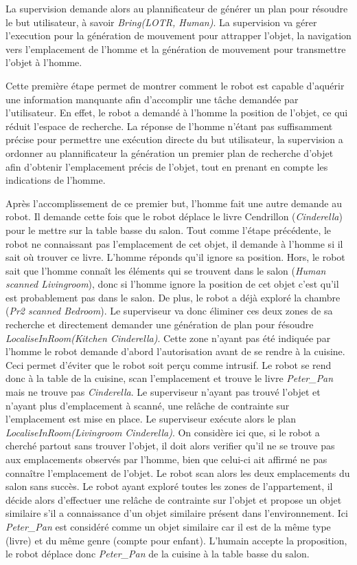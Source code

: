 \documentclass[a4paper,11pt,twoside]{StyleThese}
\begin{document}
La supervision demande alors au plannificateur de générer un plan pour résoudre le but utilisateur, à savoir \textit{Bring(LOTR, Human)}.
La supervision va gérer l'execution pour la génération de mouvement pour attrapper l'objet, la navigation vers l'emplacement de l'homme et la génération de mouvement pour transmettre l'objet à l'homme.

Cette première étape permet de montrer comment le robot est capable d'aquérir une information manquante afin d'accomplir une tâche demandée par l'utilisateur. En effet, le robot a demandé à l'homme la position de l'objet, ce qui réduit l'espace de recherche. La réponse de l'homme n'étant pas suffisamment précise pour permettre une exécution directe du but utilisateur, la supervision a ordonner au plannificateur la génération un premier plan de recherche d'objet afin d'obtenir l'emplacement précis de l'objet, tout en prenant en compte les indications de l'homme.

Après l'accomplissement de ce premier but, l'homme fait une autre demande au robot. Il demande cette fois que le robot déplace le livre Cendrillon (\textit{Cinderella}) pour le mettre sur la table basse du salon.
Tout comme l'étape précédente, le robot ne connaissant pas l'emplacement de cet objet, il demande à l'homme si il sait où trouver ce livre.
L'homme réponds qu'il ignore sa position.
Hors, le robot sait que l'homme connaît les éléments qui se trouvent dans le salon (\textit{Human scanned  Livingroom}), donc si l'homme ignore la position de cet objet c'est qu'il est probablement pas dans le salon. De plus, le robot a déjà exploré la chambre (\textit{Pr2 scanned Bedroom}). Le superviseur va donc éliminer ces deux zones de sa recherche et directement demander une génération de plan pour ŕésoudre \textit{LocaliseInRoom(Kitchen Cinderella)}. Cette zone n'ayant pas été indiquée par l'homme le robot demande d'abord l'autorisation avant de se rendre à la cuisine. Ceci permet d'éviter que le robot soit perçu comme intrusif.
Le robot se rend donc à la table de la cuisine, scan l'emplacement et trouve le livre \textit{Peter\_Pan} mais ne trouve pas \textit{Cinderella}.
Le superviseur n'ayant pas trouvé l'objet et n'ayant plus d'emplacement à scanné, une relâche de contrainte sur l'emplacement est mise en place.
Le superviseur exécute alors le plan \textit{LocaliseInRoom(Livingroom Cinderella)}. On considère ici que, si le robot a cherché partout sans trouver l'objet, il doit alors verifier qu'il ne se trouve pas aux emplacements observés par l'homme, bien que celui-ci ait affirmé ne pas connaître l'emplacement de l'objet.
Le robot scan alors les deux emplacements du salon sans succès.
Le robot ayant exploré toutes les zones de l'appartement, il décide alors d'effectuer une relâche de contrainte sur l'objet et propose un objet similaire s'il a connaissance d'un objet similaire présent dans l'environnement.
Ici \textit{Peter\_Pan} est considéré comme un objet similaire car il est de la même type (livre) et du même genre (compte pour enfant).
L'humain accepte la proposition, le robot déplace donc \textit{Peter\_Pan} de la cuisine à la table basse du salon.
\end{document}

